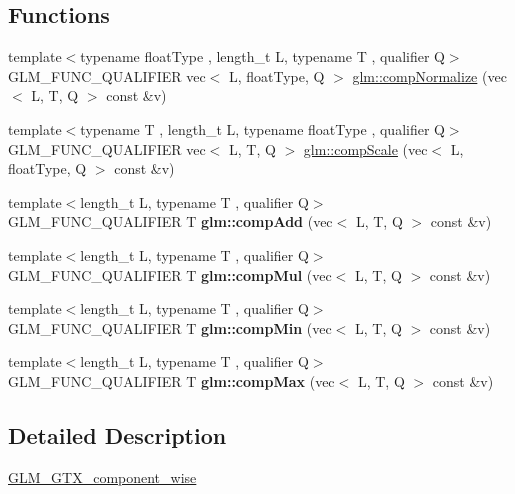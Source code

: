 \subsection*{Functions}
\begin{DoxyCompactItemize}
\item 
{\footnotesize template$<$typename float\+Type , length\+\_\+t L, typename T , qualifier Q$>$ }\\G\+L\+M\+\_\+\+F\+U\+N\+C\+\_\+\+Q\+U\+A\+L\+I\+F\+I\+ER vec$<$ L, float\+Type, Q $>$ \hyperlink{group__gtx__component__wise_ga8f2b81ada8515875e58cb1667b6b9908}{glm\+::comp\+Normalize} (vec$<$ L, T, Q $>$ const \&v)
\item 
{\footnotesize template$<$typename T , length\+\_\+t L, typename float\+Type , qualifier Q$>$ }\\G\+L\+M\+\_\+\+F\+U\+N\+C\+\_\+\+Q\+U\+A\+L\+I\+F\+I\+ER vec$<$ L, T, Q $>$ \hyperlink{group__gtx__component__wise_ga80abc2980d65d675f435d178c36880eb}{glm\+::comp\+Scale} (vec$<$ L, float\+Type, Q $>$ const \&v)
\item 
\mbox{\label{component__wise_8inl_ad69e502a1932680c5b2767998e2434d7}} 
{\footnotesize template$<$length\+\_\+t L, typename T , qualifier Q$>$ }\\G\+L\+M\+\_\+\+F\+U\+N\+C\+\_\+\+Q\+U\+A\+L\+I\+F\+I\+ER T {\bfseries glm\+::comp\+Add} (vec$<$ L, T, Q $>$ const \&v)
\item 
\mbox{\label{component__wise_8inl_aa5abf1348de4c38ac2d81be2e0f4798e}} 
{\footnotesize template$<$length\+\_\+t L, typename T , qualifier Q$>$ }\\G\+L\+M\+\_\+\+F\+U\+N\+C\+\_\+\+Q\+U\+A\+L\+I\+F\+I\+ER T {\bfseries glm\+::comp\+Mul} (vec$<$ L, T, Q $>$ const \&v)
\item 
\mbox{\label{component__wise_8inl_a10ecfac6e963c12a5e470233798de5aa}} 
{\footnotesize template$<$length\+\_\+t L, typename T , qualifier Q$>$ }\\G\+L\+M\+\_\+\+F\+U\+N\+C\+\_\+\+Q\+U\+A\+L\+I\+F\+I\+ER T {\bfseries glm\+::comp\+Min} (vec$<$ L, T, Q $>$ const \&v)
\item 
\mbox{\label{component__wise_8inl_a0d4cda53cef1caae2fb974492b2e81df}} 
{\footnotesize template$<$length\+\_\+t L, typename T , qualifier Q$>$ }\\G\+L\+M\+\_\+\+F\+U\+N\+C\+\_\+\+Q\+U\+A\+L\+I\+F\+I\+ER T {\bfseries glm\+::comp\+Max} (vec$<$ L, T, Q $>$ const \&v)
\end{DoxyCompactItemize}


\subsection{Detailed Description}
\hyperlink{group__gtx__component__wise}{G\+L\+M\+\_\+\+G\+T\+X\+\_\+component\+\_\+wise} 